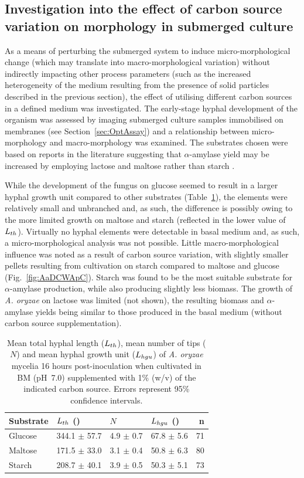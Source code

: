 \subsection{Investigation into the effect of carbon source variation on morphology in submerged culture}

As a means of perturbing the submerged system to induce micro-morphological change (which may translate into macro-morphological variation) without indirectly impacting other process parameters (such as the increased heterogeneity of the medium resulting from the presence of solid particles described in the previous section), the effect of utilising different carbon sources in a defined medium was investigated. The early-stage hyphal development of the organism was assessed by imaging submerged culture samples immobilised on membranes (see Section~\ref{sec:OptAssay}) and a relationship between micro-morphology and macro-morphology was examined. The substrates chosen were based on reports in the literature suggesting that $\alpha$-amylase yield may be increased by employing lactose and maltose rather than starch \cite{ramachandran2004}.

While the development of the fungus on glucose seemed to result in a larger hyphal growth unit compared to other substrates (Table~\ref{tab:VaryCMicroMorph}), the elements were relatively small and unbranched and, as such, the difference is possibly owing to the more limited growth on maltose and starch (reflected in the lower value of $L_{th}$). Virtually no hyphal elements were detectable in basal medium and, as such, a micro-morphological analysis was not possible. Little macro-morphological influence was noted as a result of carbon source variation, with slightly smaller pellets resulting from cultivation on starch compared to maltose and glucose (Fig.~\ref{fig:AaDCWApC}). Starch was found to be the most suitable substrate for $\alpha$-amylase production, while also producing slightly less biomass. The growth of \emph{A. oryzae} on lactose was limited (not shown), the resulting biomass and $\alpha$-amylase yields being similar to those produced in the basal medium (without carbon source supplementation).

\begin{table}[tb]
	\centering
	\footnotesize
	\caption{Mean total hyphal length ($L_{th}$), mean number of tips ($N$) and mean hyphal growth unit ($L_{hgu}$) of \emph{A. oryzae} mycelia 16 hours post-inoculation when cultivated in BM (pH~7.0) supplemented with 1\% (w/v) of the indicated carbon source. Errors represent 95\% confidence intervals.}
	\label{tab:VaryCMicroMorph}
	\begin{tabularx}{(\textwidth - 1cm)}{X X X X r}
		\toprule
		Substrate & $L_{th}$ (\omic) & $N$ & $L_{hgu}$ (\omic) & n\\ \midrule
		Glucose & 344.1 $\pm$ 57.7 & 4.9 $\pm$ 0.7 & 67.8 $\pm$ 5.6 & 71\\
		Maltose & 171.5 $\pm$ 33.0 & 3.1 $\pm$ 0.4 & 50.8 $\pm$ 6.3 & 80\\
		Starch & 208.7 $\pm$ 40.1 & 3.9 $\pm$ 0.5 & 50.3 $\pm$ 5.1 & 73\\
		\bottomrule
	\end{tabularx}
\end{table}

